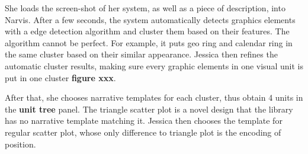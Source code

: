 
She loads the screen-shot of her system, as well as a piece of description, into Narvis.
After a few seconds, the system automatically detects graphics elements with a edge detection algorithm and cluster them based on their features. The algorithm cannot be perfect. For example, it puts geo ring and calendar ring in the same cluster based on their similar appearance. 
Jessica then refines the automatic cluster results, making sure every graphic elements in one visual unit is put in one cluster \textbf{figure xxx}. 

After that, she chooses narrative templates for each cluster, thus obtain 4 units in the \textbf{unit tree} panel. The triangle scatter plot is a novel design that the library has no narrative template matching it. Jessica then chooses the template for regular scatter plot, whose only difference to triangle plot is the encoding of position. 

